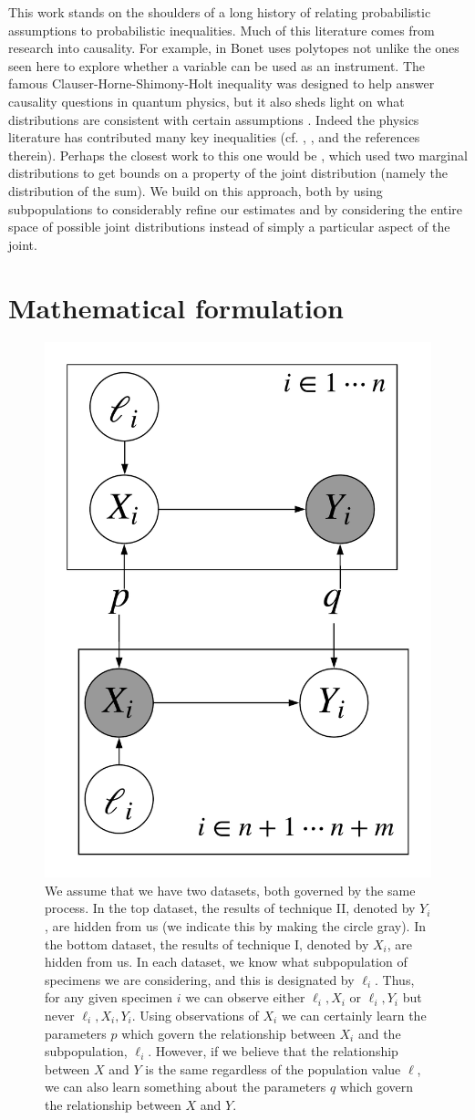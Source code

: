 This work stands on the shoulders of a long history of relating probabilistic assumptions to probabilistic inequalities.  Much of this literature comes from research into causality.  For example, in \cite{bonet2001instrumentality} Bonet uses polytopes not unlike the ones seen here to explore whether a variable can be used as an instrument.  The famous Clauser-Horne-Shimony-Holt inequality was designed to help answer causality questions in quantum physics, but it also sheds light on what distributions are consistent with certain assumptions \cite{clauser1969proposed}.  Indeed the physics literature has contributed many key inequalities (cf. \cite{chaves2014inferring}, \cite{kela2017semidefinite}, and the references therein).  Perhaps the closest work to this one would be \cite{makarov1982estimates}, which used two marginal distributions to get bounds on a property of the joint distribution (namely the distribution of the sum).  We build on this approach, both by using subpopulations to considerably refine our estimates and by considering the entire space of possible joint distributions instead of simply a particular aspect of the joint.  

\section{Mathematical formulation}

\begin{figure}
\hfill{}\includegraphics[width=.3\textwidth]{pics/plate}\hfill{}
\caption{We assume that we have two datasets, both governed by the same process.  In the top dataset, the results of technique II, denoted by $Y_i$, are hidden from us (we indicate this by making the circle gray).  In the bottom dataset, the results of technique I, denoted by $X_i$, are hidden from us.  In each dataset, we know what subpopulation of specimens we are considering, and this is designated by $\ell_i$.  Thus, for any given specimen $i$ we can observe either $\ell_i,X_i$ or $\ell_i,Y_i$ but never $\ell_i,X_i,Y_i$.  Using observations of $X_i$ we can certainly learn the parameters $p$ which govern the relationship between $X_i$ and the subpopulation, $\ell_i$.  However, if we believe that the relationship between $X$ and $Y$ is the same regardless of the population value $\ell$, we can also learn something about the parameters $q$ which govern the relationship between $X$ and $Y$.\label{fig:plate}}
\end{figure}

